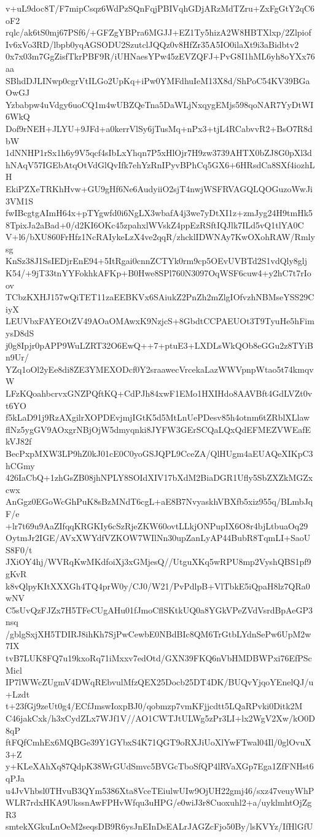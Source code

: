 v+uL9doc8T/F7mipCsqz6WdPzSQnFqjPBIVqhGDjARzMdTZru+ZxFgGtY2qC6oF2
rqlc/ak6tS0mj67PSf6/+GFZgYBPra6MGJJ+EZ1Ty5hizA2W8HBTXlxp/2Zlpiof
Iv6xVo3RD/lbpb0yqAGSODU2SzutclJQQz0v8HfZr35A5IO0ilaXt9i3aBidbtv2
0x7x03m7GgZisfTkrPBF9R/iUHNaesYPw45zEVZQFJ+PvG8I1hML6yh8oYXx76aa
SBhdDJLINwp0cgrVtILGo2UpKq+iPw0YMFdhuIeM13X8d/ShPoC54KV39BGaOwGJ
Yzbabpw4uVdgy6uoCQ1m4wUBZQeTna5DaWLjNxqygEMjs598qoNAR7YyDtWI6WkQ
Dof9rNEH+JLYU+9JFd+a0kerrVlSy6jTusMq+nPx3+tjL4RCabvvR2+BsO7R8dbW
1dNNHP1rSx1h6y9V5qcf4sIbLxYhqn7P5xHlOjr7H9zw3739AHTX0bZJ8G0pXl3d
hNAqV57IGEbAtqOtVdGlQvIfk7ehYzRnIPyvBPhCq5GX6+6HRsdCa8SXf4iozhLH
EkiPZXeTRKhHvw+GU9gHf6Ne6AudyiiO2sjT4nwjWSFRVAGQLQOGuzoWwJi3VM1S
fwIBcgtgAImH64x+pTYgwfd0i6NgLX3wbafA4j3we7yDtXI1z+zmJyg24H9tmHk5
8TpixJa2aBad+0/d2KI6OKc45zpahxlWVskZ4ppEzRSftIQJlk7ILd5vQ1tlYA0C
V+l6/bXU860FrHfz1NcRAIykeLzX4ve2qqR/zhcklIDWNAy7KwOXohRAW/Rmlysg
KnSz38J1SsIEDjrEnE94+5ItRgai0cnnZCTYk0rm9cp5OEvUVBTd2S1vdQly8glj
K54/+9jT33tnYYFokhkAFKp+B0Hwe8SPl760N3097OqWSF6cuw4+y2hC7t7rIoov
TCbzKXHJ157wQiTET11zaEEBKVx6SAiukZ2PnZh2mZlgIOfvzhNBMseYSS29CiyX
LEUVbxFAYEOtZV49AOaOMAwxK9NzjcS+8GbdtCCPAEUOt3T9TyuHe5hFimysD8dS
j0g8Ipjr0pAPP9WuLZRT32O6EwQ++7+ptuE3+LXDLsWkQOb8eGGu2z8TYiBn9Ur/
YZq1oOl2yEe8di8ZE3YMEXODcf0Y2sraawecVrcekaLazWWVpnpWtao5t74kmqvW
LFzKQoahbcrvxGNZPQftKQ+CdPJh84xwF1EMo1HXIHdo8AAVBft4GdLVZt0vt6YO
f5kLaD91j9RzAXgilrXOPDEvjmjIGtK5d5MtLnUePDesv85h4otnm6tZRblXLlaw
flNz5ygGV9AOxgrNBjOjW5dmyqnki8JYFW3GErSCQaLQxQdEFMEZVWEafEkVJ82f
BecPxpMXW3LP9hZ0kJ01cE0C0yoGSJQPL9CceZA/QlHUgm4aEUAQeXIKpC3hCGmy
426IaCbQ+1zhGsZB08jhNPLY8SOIdXIV17bXdM2BiaDGR1Ufly5SbZXZkMGZxcwx
AnGgz0EGoWcGhPuK8sBzMNdT6cgL+aE8B7NvyaskhVBXfb5xiz955q/BLmbJqF/e
+lr7t69u9AaZIfqqKRGKIy6cSzRjeZKW60ovtLLkjONPupIX6O8r4bjLtbuaOq29
OytmJr2IGE/AVxXWYdfVZKOW7WIlNn30upZanLyAP44BubR8TqmLI+SaoUS8F0/t
JXiOY4hj/WVRqKwMKdfoiXj3xGMjesQ//UtguXKq5wRPU8mp2VyshQBS1pf9gKvR
k8vQlpyKItXXXGh4TQ4prW0y/CJ0/W21/PvPdlpB+VlTbkE5iQpaH8lz7QRa0wNV
C5sUvQzFJZx7H5TFeCUgAHu01fJmoCflSKtkUQ0a8YGkVPeZVdVsrdBpAeGP3nsq
/gblgSxjXH5TDIRJ8ihKh7SjPwCewbE0NBdBIc8QM6TrGtbLYdnSePw6UpM2w7IX
tvB7LUK8FQ7u19kxoRq71iMxxv7edOtd/GXN39FKQ6nVbHMDBWPxi76EfPScMicl
IP7lWWcZUgmV4DWqREbvulMfzQEX25Docb25DT4DK/BUQvYjqoYEnelQJ/u+Lzdt
t+23fGj9zeUt0g4/ECfJmswIoxpBJ0/qobmzp7vmKFjjcdtt5LQaRPvki0Ditk2M
C46jakCxk/h3xCydZLx7WJf1V//AO1CWTJtULWg5zPr3LI+lx2WgV2Xw/kO0D8qP
ftFQfCmhEx6MQBGe39Y1GYbxS4K71QGT9oRXJiUoXlYwFTwal04Il/0glOvuX3+Z
y+KLeXAhXq87QdpK38WrGUdSmvc5BVGcTboSfQP4lRVaXGp7Ega1ZfFNHst6qPJa
u4JvVhbsl0THvuB3QYm5386Xta8VceTEiulwUIw9OjUH22gmj46/sxz47veuyWhP
WLR7rdxHKA9UkssnAwFPHvWfqu3uHPG/e0wiJ3r8Cuoxuhl2+a/uyklmhtOjZgR3
smtekXGkuLnOeM2seqsDB9R6ysJnEInDsEALrJAGZcFjo50By/lsKVYz/IfHlGfU
